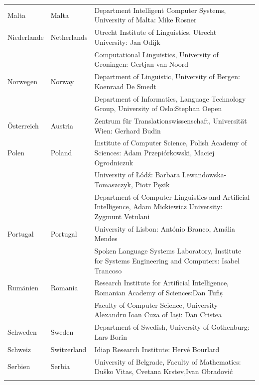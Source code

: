 \documentclass[]{../../metanetpaper}
\begin{document}
\begin{longtable}{@{}llp{113mm}@{}}
  Malta & \textcolor{grey1}{Malta} & Department Intelligent Computer Systems, University of Malta: Mike Rosner\\ \addlinespace
  Niederlande & \textcolor{grey1}{Netherlands} & Utrecht Institute of Linguistics, Utrecht University: Jan Odijk\\ \addlinespace 
  & & Computational Linguistics, University of Groningen: Gertjan van Noord\\ \addlinespace
  Norwegen & \textcolor{grey1}{Norway} & Department of Linguistic, University of Bergen: Koenraad De Smedt\\ \addlinespace 
  & & Department of Informatics, Language Technology Group, University of Oslo:\newline Stephan Oepen \\ \addlinespace
  Österreich & \textcolor{grey1}{Austria} & Zentrum für Translationswissenschaft, Universität Wien: Gerhard Budin\\ \addlinespace 
  Polen & \textcolor{grey1}{Poland} & Institute of Computer Science, Polish Academy of Sciences: Adam Przepiórkowski, Maciej Ogrodniczuk \\ \addlinespace
  & & University of Łódź: Barbara Lewandowska-Tomaszczyk, Piotr Pęzik\\ \addlinespace
  & & Department of Computer Linguistics and Artificial Intelligence, Adam Mickiewicz University: Zygmunt Vetulani \\ \addlinespace
  Portugal & \textcolor{grey1}{Portugal} & University of Lisbon: António Branco, Amália Mendes \\ \addlinespace
  & & Spoken Language Systems Laboratory, Institute for Systems Engineering and Computers: Isabel Trancoso \\ \addlinespace
  Rumänien & \textcolor{grey1}{Romania} & Research Institute for Artificial Intelligence, Romanian Academy of Sciences:\newline Dan Tufiș \\ \addlinespace
  & & Faculty of Computer Science, University Alexandru Ioan Cuza of Iași: Dan Cristea \\ \addlinespace
  Schweden & \textcolor{grey1}{Sweden} & Department of Swedish, University of Gothenburg: Lars Borin \\ \addlinespace 
  Schweiz & \textcolor{grey1}{Switzerland} & Idiap Research Institute: Hervé Bourlard \\ \addlinespace 
  Serbien & \textcolor{grey1}{Serbia} & University of Belgrade, Faculty of Mathematics: Duško Vitas, Cvetana Krstev,\newline Ivan Obradović \\ \addlinespace

\end{longtable}
\end{document}

